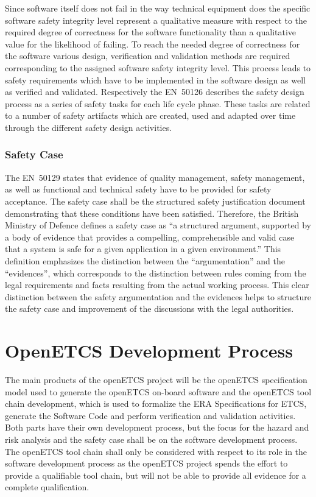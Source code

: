 \documentclass{template/openetcs_report}
\begin{document}
Since software itself does not fail in the way technical equipment does the specific software safety integrity level represent a qualitative measure with respect to the required degree of correctness for the software functionality than a qualitative value for the likelihood of failing. 
To reach the needed degree of correctness for the software various design, verification and validation methods are required corresponding to the assigned software safety integrity level. This process leads to safety requirements which have to be implemented in the software design as well as verified and validated. Respectively the EN~50126 describes the safety design process as a series of safety tasks for each life cycle phase. These tasks are related to a number of safety artifacts which are created, used and adapted over time through the different safety design activities.


\subsection{Safety Case}

The EN~50129 states that evidence of quality management, safety management, as well as functional and technical safety have to be provided for safety acceptance. The safety case shall be the structured safety justification document demonstrating that these conditions have been satisfied.
Therefore, the British Ministry of Defence defines a safety case as “a structured argument, supported by a body of evidence that provides a compelling, comprehensible and valid case that a system is safe for a given application in a given environment.”\cite{MinistryofDefence.2007} This definition emphasizes the distinction between the “argumentation” and the “evidences”, which corresponds to the distinction between rules coming from the legal requirements and facts resulting from the actual working process. This clear distinction between the safety argumentation and the evidences helps to structure the safety case and improvement of the discussions with the legal authorities.\cite{Muller.2010}

\chapter{OpenETCS Development Process}
\label{sec:development-process}

The main products of the openETCS project will be the openETCS specification model used to generate the openETCS on-board software and the openETCS tool chain development, which is used to formalize the ERA Specifications for ETCS, generate the Software Code and perform verification and validation activities. Both parts have their own development process, but the focus for the hazard and risk analysis and the safety case shall be on the software development process. The openETCS tool chain shall only be considered with respect to its role in the software development process as the openETCS project spends the effort to provide a qualifiable tool chain, but will not be able to provide all evidence for a complete qualification.
\end{document}
